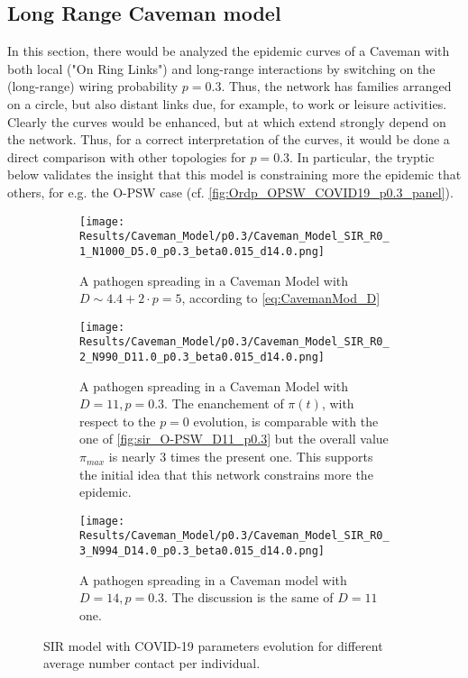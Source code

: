 \documentclass[a4paper,10pt,twoside]{book} %
\theoremstyle{definition}
\begin{document}
\subsection*{Long Range Caveman model}
In this section, there would be analyzed the epidemic curves of a Caveman with both local ("On Ring Links") and long-range interactions by switching on the (long-range) wiring probability $p = 0.3$. Thus, the network has families arranged on a circle, but also distant links due, for example, to work or leisure activities.
Clearly the curves would be enhanced, but at which extend strongly depend on the network. Thus, for a correct interpretation of the curves, it would be done a direct comparison with other topologies for $p = 0.3$. In particular, the tryptic below validates the insight that this model is constraining more the epidemic that others, for e.g. the O-PSW case (cf. \autoref{fig:Ordp_OPSW_COVID19_p0.3_panel}).
\begin{figure}[htbp]
	\centering
	\begin{subfigure}{0.9\linewidth}
		\texttt{[image: Results/Caveman\_Model/p0.3/Caveman\_Model\_SIR\_R0\_1\_N1000\_D5.0\_p0.3\_beta0.015\_d14.0.png]}
		\caption{A pathogen spreading in a Caveman Model with $D \sim 4.4+ 2\cdot p = 5$, according to \autoref{eq:CavemanMod_D}}
		\label{fig:sir_CM_D4_OR1_p0.3}
	\end{subfigure}
	\par\smallskip
	\begin{subfigure}{0.9\linewidth}
		\texttt{[image: Results/Caveman\_Model/p0.3/Caveman\_Model\_SIR\_R0\_2\_N990\_D11.0\_p0.3\_beta0.015\_d14.0.png]}
		\caption{A pathogen spreading in a Caveman Model with $D = 11, p = 0.3$. The enanchement of $\pi(t)$, with respect to the $ p=0$ evolution, is comparable with the one of \autoref{fig:sir_O-PSW_D11_p0.3} but the overall value $ \pi_{max}$ is nearly $3$ times the present one. This supports the initial idea that this network constrains more the epidemic.}
		\label{fig:sir_CM_D11_p0.3}
	\end{subfigure}
	\par\smallskip
	\begin{subfigure}{0.9\linewidth}
		\texttt{[image: Results/Caveman\_Model/p0.3/Caveman\_Model\_SIR\_R0\_3\_N994\_D14.0\_p0.3\_beta0.015\_d14.0.png]}
		\caption{A pathogen spreading in a Caveman model with $D = 14, p = 0.3$. The discussion is the same of $D = 11$ one.}
		\label{fig:sir_CM_D13_p0.3}
	\end{subfigure}
	\caption{SIR model with COVID-19 parameters evolution for different average number contact per individual.}
	\label{fig:sir_CM_COVID_p0.3}
\end{figure}
\end{document}
